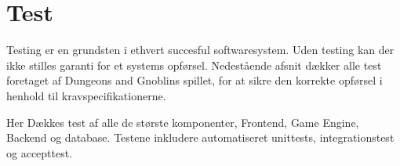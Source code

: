 \section{Test}
Testing er en grundsten i ethvert succesful softwaresystem. Uden testing kan
der ikke stilles garanti for et systems opførsel. Nedestående afsnit dækker
alle test foretaget af Dungeons and Gnoblins spillet, for at sikre den korrekte
opførsel i henhold til kravspecifikationerne.

Her Dækkes test af alle de største komponenter, Frontend, Game Engine, Backend og
database. Testene inkludere automatiseret unittests, integrationstest og accepttest.


